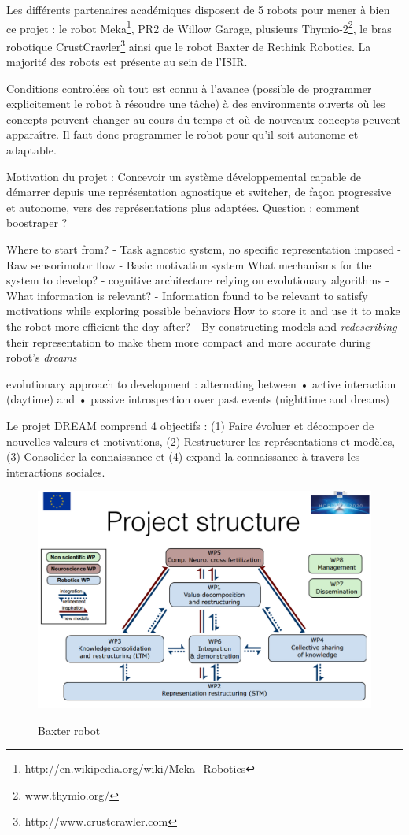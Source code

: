 \documentclass{llncs}
\begin{document}
Les différents partenaires académiques disposent de 5 robots pour mener à bien ce projet : le robot Meka\footnote{http://en.wikipedia.org/wiki/Meka\_Robotics}, PR2 de Willow Garage, plusieurs Thymio-2\footnote{www.thymio.org/}, le bras robotique CrustCrawler\footnote{http://www.crustcrawler.com} ainsi que le robot Baxter de Rethink Robotics. La majorité des robots est présente au sein de l'ISIR.

Conditions controlées où tout est connu à l'avance (possible de programmer explicitement le robot à résoudre une tâche) à des environments ouverts où les concepts peuvent changer au cours du temps et où de nouveaux concepts peuvent apparaître. Il faut donc programmer le robot pour qu'il soit autonome et adaptable.

Motivation du projet : Concevoir un système développemental capable de démarrer depuis une représentation agnostique et switcher, de façon progressive et autonome, vers des représentations plus adaptées. Question : comment boostraper ?

Where to start from?
- Task agnostic system, no specific representation imposed
- Raw sensorimotor flow
- Basic motivation system
What mechanisms for the system to develop?
- cognitive architecture relying on evolutionary algorithms
- What information is relevant?
- Information found to be relevant to satisfy motivations while exploring
possible behaviors
How to store it and use it to make the robot more efficient the day after?
- By constructing models and \textit{redescribing} their representation to make
them more compact and more accurate during robot’s \textit{dreams}

evolutionary approach to
development : alternating between
• active interaction (daytime) and
• passive introspection over past
events (nighttime and dreams)

Le projet DREAM comprend 4 objectifs : (1) Faire évoluer et décompoer de nouvelles valeurs et motivations, (2) Restructurer les représentations et modèles, (3) Consolider la connaissance et (4) expand la connaissance à travers les interactions sociales.

\begin{figure}
	\centering
	\includegraphics[width=.7\textwidth]{figures/project_structure.png}
	\label{fig:dream}
	\caption{Baxter robot}
\end{figure}
\end{document}
